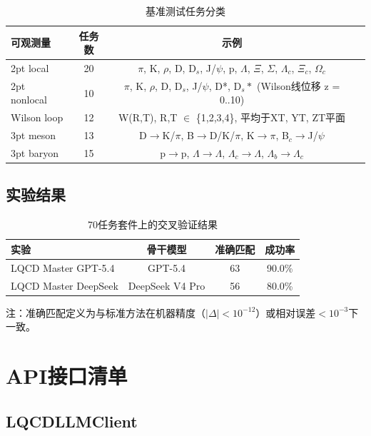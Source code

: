\documentclass[12pt,a4paper]{ctexart}
\begin{document}
\begin{table}[H]
\centering
\caption{基准测试任务分类}
\label{tab:benchmark}
\begin{tabular}{@{}lccp{5cm}@{}}
\toprule
\textbf{可观测量} & \textbf{任务数} & \textbf{示例} \\
\midrule
2pt local & 20 & $\pi$, K, $\rho$, D, D$_s$, J/$\psi$, p, $\Lambda$, $\Xi$, $\Sigma$, $\Lambda_c$, $\Xi_c$, $\Omega_c$ \\
2pt nonlocal & 10 & $\pi$, K, $\rho$, D, D$_s$, J/$\psi$, D*, D$_s*$ (Wilson线位移 z = 0..10) \\
Wilson loop & 12 & W(R,T), R,T $\in$ \{1,2,3,4\}, 平均于XT, YT, ZT平面 \\
3pt meson & 13 & D$\to$K/$\pi$, B$\to$D/K/$\pi$, K$\to\pi$, B$_c\to$J/$\psi$ \\
3pt baryon & 15 & p$\to$p, $\Lambda\to\Lambda$, $\Lambda_c\to\Lambda$, $\Lambda_b\to\Lambda_c$ \\
\bottomrule
\end{tabular}
\end{table}

\subsection{实验结果}

\begin{table}[H]
\centering
\caption{70任务套件上的交叉验证结果}
\label{tab:results}
\begin{tabular}{@{}lccc@{}}
\toprule
\textbf{实验} & \textbf{骨干模型} & \textbf{准确匹配} & \textbf{成功率} \\
\midrule
LQCD Master GPT-5.4 & GPT-5.4 & 63 & 90.0\% \\
LQCD Master DeepSeek & DeepSeek V4 Pro & 56 & 80.0\% \\
\bottomrule
\end{tabular}
\end{table}

注：准确匹配定义为与标准方法在机器精度（$|\Delta| < 10^{-12}$）或相对误差$< 10^{-3}$下一致。

\section{API接口清单}

\subsection{LQCDLLMClient}
\end{document}

